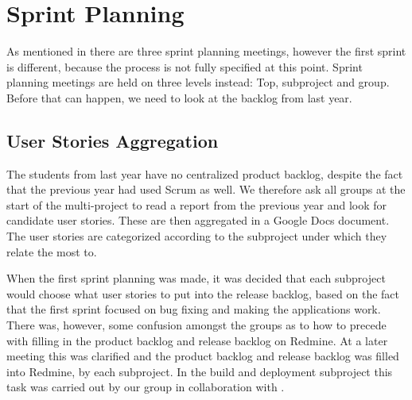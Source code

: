 \chapter{Sprint Planning}\label{chap:sprint1_planning}
As mentioned in  there are three sprint planning meetings, however the first sprint is different, because the process is not fully specified at this point. Sprint planning meetings are held on three levels instead: Top, subproject and group. Before that can happen, we need to look at the backlog from last year.

\section{User Stories Aggregation}
The students from last year have no centralized product backlog, despite the fact that the previous year had used Scrum as well. We therefore ask all groups at the start of the multi-project to read a report from the previous year and look for candidate user stories. These are then aggregated in a Google Docs document. The user stories are categorized according to the subproject under which they relate the most to.

When the first sprint planning was made, it was decided that each subproject would choose what user stories to put into the release backlog, based on the fact that the first sprint focused on bug fixing and making the applications work. There was, however, some confusion amongst the groups as to how to precede with filling in the product backlog and release backlog on Redmine. At a later meeting this was clarified and the product backlog and release backlog was filled into Redmine, by each subproject. In the build and deployment subproject this task was carried out by our group in collaboration with .
